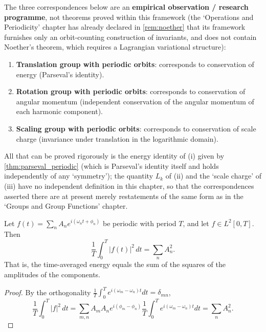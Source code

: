 \begin{remark}\label{thm:noether_group_with_periodic_orbits}
\leavevmode
The three correspondences below are an \textbf{empirical observation / research programme}, not theorems proved within this framework (the `Operations and Periodicity' chapter has already declared in \cref{rem:noether} that its framework furnishes only an orbit-counting construction of invariants, and does not contain Noether's theorem, which requires a Lagrangian variational structure):
\begin{enumerate}[label=(\roman*)]
    \item \textbf{Translation group with periodic orbits}: corresponds to conservation of energy (Parseval's identity).
    \item \textbf{Rotation group with periodic orbits}: corresponds to conservation of angular momentum (independent conservation of the angular momentum of each harmonic component).
    \item \textbf{Scaling group with periodic orbits}: corresponds to conservation of scale charge (invariance under translation in the logarithmic domain).
\end{enumerate}
All that can be proved rigorously is the energy identity of (i) given by \cref{thm:parseval_periodic} (which is Parseval's identity itself and holds independently of any `symmetry'); the quantity $L_k$ of (ii) and the `scale charge' of (iii) have no independent definition in this chapter, so that the correspondences asserted there are at present merely restatements of the same form as in the `Groups and Group Functions' chapter.
\end{remark}

\begin{theorem}\label{thm:parseval_periodic}
Let $f(t)=\sum_{n}A_ne^{i(\omega_nt+\phi_n)}$ be periodic with period $T$, and let $f\in L^2[0,T]$. Then
\[
\frac{1}{T}\int_0^T |f(t)|^2\,dt = \sum_n A_n^2.
\]
That is, the time-averaged energy equals the sum of the squares of the amplitudes of the components.
\end{theorem}

\begin{proof}
By the orthogonality $\frac{1}{T}\int_0^T e^{i(\omega_m-\omega_n)t}dt=\delta_{mn}$,
\[
\frac{1}{T}\int_0^T |f|^2\,dt = \sum_{m,n}A_mA_ne^{i(\phi_m-\phi_n)}\frac{1}{T}\int_0^T e^{i(\omega_m-\omega_n)t}dt = \sum_n A_n^2.
\]
\end{proof}

